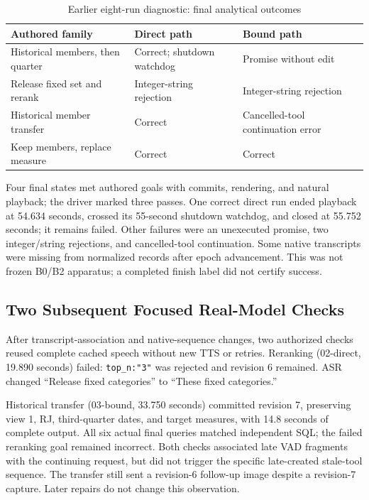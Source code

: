 \documentclass[conference,10pt,letterpaper]{IEEEtran}
\begin{document}
\begin{table}[t]
\caption{Earlier eight-run diagnostic: final analytical outcomes}
\label{tab:matrix}
\centering\small
\begin{tabularx}{\columnwidth}{@{}p{}YY@{}}
\toprule
Authored family & Direct path & Bound path \\
\midrule
Historical members, then quarter & Correct; shutdown watchdog & Promise without edit \\
Release fixed set and rerank & Integer-string rejection & Integer-string rejection \\
Historical member transfer & Correct & Cancelled-tool continuation error \\
Keep members, replace measure & Correct & Correct \\
\bottomrule
\end{tabularx}
\end{table}

Four final states met authored goals with commits, rendering, and natural playback; the driver marked three passes. One correct direct run ended playback at 54.634 seconds, crossed its 55-second shutdown watchdog, and closed at 55.752 seconds; it remains failed. Other failures were an unexecuted promise, two integer/string rejections, and cancelled-tool continuation. Some native transcripts were missing from normalized records after epoch advancement. This was not frozen B0/B2 apparatus; a completed finish label did not certify success.

\subsection{Two Subsequent Focused Real-Model Checks}
After transcript-association and native-sequence changes, two authorized checks reused complete cached speech without new TTS or retries. Reranking (02-direct, 19.890 seconds) failed: \texttt{top\_n:"3"} was rejected and revision 6 remained. ASR changed ``Release fixed categories'' to ``These fixed categories.''

Historical transfer (03-bound, 33.750 seconds) committed revision 7, preserving view 1, RJ, third-quarter dates, and target measures, with 14.8 seconds of complete output. All six actual final queries matched independent SQL; the failed reranking goal remained incorrect. Both checks associated late VAD fragments with the continuing request, but did not trigger the specific late-created stale-tool sequence. The transfer still sent a revision-6 follow-up image despite a revision-7 capture. Later repairs do not change this observation.
\end{document}

